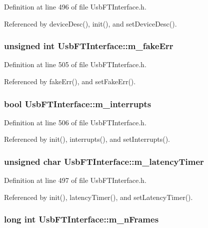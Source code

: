 Definition at line 496 of file UsbFTInterface.h.

Referenced by deviceDesc(), init(), and setDeviceDesc().\hypertarget{classUsbFTInterface_ab3660cba031df164b2d2df6e4c40f291}{
\subsubsection[{m\_\-fakeErr}]{\setlength{\rightskip}{0pt plus 5cm}unsigned int {\bf UsbFTInterface::m\_\-fakeErr}}}
\label{classUsbFTInterface_ab3660cba031df164b2d2df6e4c40f291}


Definition at line 505 of file UsbFTInterface.h.

Referenced by fakeErr(), and setFakeErr().\hypertarget{classUsbFTInterface_a0a6e3a781ead9833a413e230c6f8d1f4}{
\subsubsection[{m\_\-interrupts}]{\setlength{\rightskip}{0pt plus 5cm}bool {\bf UsbFTInterface::m\_\-interrupts}}}
\label{classUsbFTInterface_a0a6e3a781ead9833a413e230c6f8d1f4}


Definition at line 506 of file UsbFTInterface.h.

Referenced by init(), interrupts(), and setInterrupts().\hypertarget{classUsbFTInterface_a0eefe6f2cee132da70176562cd126718}{
\subsubsection[{m\_\-latencyTimer}]{\setlength{\rightskip}{0pt plus 5cm}unsigned char {\bf UsbFTInterface::m\_\-latencyTimer}}}
\label{classUsbFTInterface_a0eefe6f2cee132da70176562cd126718}


Definition at line 497 of file UsbFTInterface.h.

Referenced by init(), latencyTimer(), and setLatencyTimer().\hypertarget{classUsbFTInterface_a40770504afc4173034c8a8d6c5f5962c}{
\subsubsection[{m\_\-nFrames}]{\setlength{\rightskip}{0pt plus 5cm}long int {\bf UsbFTInterface::m\_\-nFrames}}}
\label{classUsbFTInterface_a40770504afc4173034c8a8d6c5f5962c}


